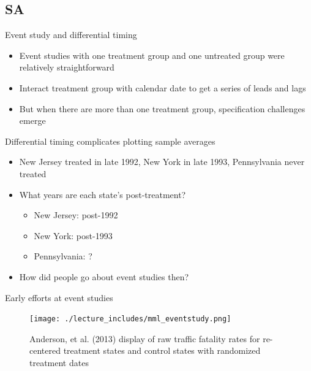 \documentclass{beamer}
\begin{document}
\subsection{SA}

\begin{frame}{Event study and differential timing}

\begin{itemize}
\item Event studies with one treatment group and one untreated group were relatively straightforward
\item Interact treatment group with calendar date to get a series of leads and lags
\item But when there are more than one treatment group, specification challenges emerge
\end{itemize}

\end{frame}


\begin{frame}{Differential timing complicates plotting sample averages}

\begin{itemize}
\item New Jersey treated in late 1992, New York in late 1993, Pennsylvania never treated
\item What years are each state's post-treatment?
	\begin{itemize}
	\item New Jersey: post-1992
	\item New York: post-1993
	\item Pennsylvania: ?
	\end{itemize}
\item How did people go about event studies then?

\end{itemize}

\end{frame}

\begin{frame}{Early efforts at event studies}

	\begin{figure}
	\texttt{[image: ./lecture\_includes/mml\_eventstudy.png]}
	\caption{Anderson, et al. (2013) display of raw traffic fatality rates for re-centered treatment states and control states with randomized treatment dates}
	\end{figure}

\end{frame}
\end{document}

